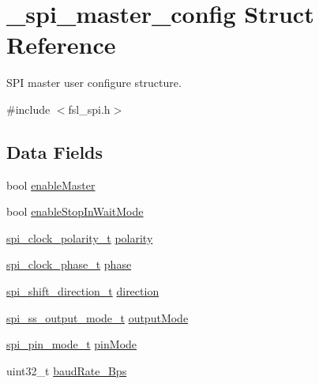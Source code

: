 \hypertarget{struct__spi__master__config}{}\section{\+\_\+spi\+\_\+master\+\_\+config Struct Reference}
\label{struct__spi__master__config}


S\+PI master user configure structure.  




{\ttfamily \#include $<$fsl\+\_\+spi.\+h$>$}

\subsection*{Data Fields}
\begin{DoxyCompactItemize}
\item 
bool \mbox{\hyperlink{struct__spi__master__config_ab8b96ba3ced8b280ac1f366f6e76a9e7}{enable\+Master}}
\item 
bool \mbox{\hyperlink{struct__spi__master__config_a9b8027e0bd0a21915f56155fdc08c5fc}{enable\+Stop\+In\+Wait\+Mode}}
\item 
\mbox{\hyperlink{group__spi__driver_ga9de95ac02ae859ac26534c06eb47b5b8}{spi\+\_\+clock\+\_\+polarity\+\_\+t}} \mbox{\hyperlink{struct__spi__master__config_ad5743b187f5dda0c1786a192ba11b043}{polarity}}
\item 
\mbox{\hyperlink{group__spi__driver_ga12e1c73dd72aaabd76ff5ce23c0d3244}{spi\+\_\+clock\+\_\+phase\+\_\+t}} \mbox{\hyperlink{struct__spi__master__config_af7cf10baeb58ef18f8d18ef7022d43d8}{phase}}
\item 
\mbox{\hyperlink{group__spi__driver_gadc24bb931a59fc64ee4cb60ed56addb4}{spi\+\_\+shift\+\_\+direction\+\_\+t}} \mbox{\hyperlink{struct__spi__master__config_ae8f40fc982ba997f08e6a1fe1fe8fd8c}{direction}}
\item 
\mbox{\hyperlink{group__spi__driver_gaba865b4b3ce19476407c3013454c8217}{spi\+\_\+ss\+\_\+output\+\_\+mode\+\_\+t}} \mbox{\hyperlink{struct__spi__master__config_a285cf929f1817b37a10f2afffc810ac8}{output\+Mode}}
\item 
\mbox{\hyperlink{group__spi__driver_ga4d2e20ceaf81868a429938113afe8726}{spi\+\_\+pin\+\_\+mode\+\_\+t}} \mbox{\hyperlink{struct__spi__master__config_ab929baca49507045ca23069da9bbe3ba}{pin\+Mode}}
\item 
uint32\+\_\+t \mbox{\hyperlink{struct__spi__master__config_aa5df547b4cb95d3c959373cf6fa672b5}{baud\+Rate\+\_\+\+Bps}}
\end{DoxyCompactItemize}


